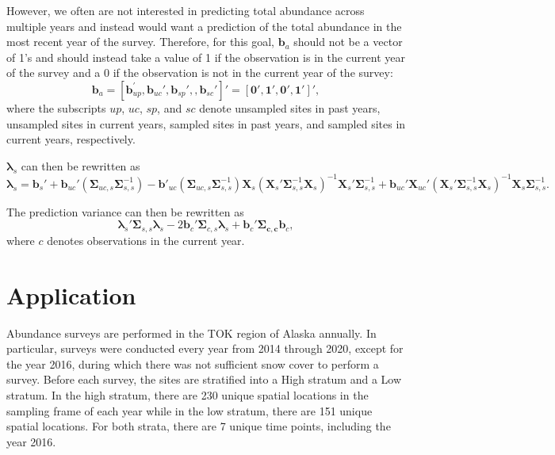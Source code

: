 \documentclass[]{interact}
\theoremstyle{plain}%
\theoremstyle{definition}
\theoremstyle{remark}
\begin{document}
However, we often are not interested in predicting total abundance
across multiple years and instead would want a prediction of the total
abundance in the most recent year of the survey. Therefore, for this
goal, \(\mathbf{b}_a\) should not be a vector of 1's and should instead
take a value of 1 if the observation is in the current year of the
survey and a 0 if the observation is not in the current year of the
survey: \mbox{} \begin{equation}
\mathbf{b}_a = [\mathbf{b}_{up}^\prime, \mathbf{b}_{uc}', \mathbf{b}_{sp}', , \mathbf{b}_{sc}']' = [\mathbf{0}', \mathbf{1}', \mathbf{0}', \mathbf{1}']',
\end{equation} \noindent where the subscripts \(up\), \(uc\), \(sp\),
and \(sc\) denote unsampled sites in past years, unsampled sites in
current years, sampled sites in past years, and sampled sites in current
years, respectively.

\(\bm{\lambda}_s\) can then be rewritten as \mbox{} \begin{equation}
\bm{\lambda}_s = \mathbf{b}_{s}' + \mathbf{b}_{uc}' (\bm{\Sigma}_{uc, s}\bm{\Sigma}_{s, s}^{-1}) - \mathbf{b}'_{uc}(\bm{\Sigma}_{uc, s} \bm{\Sigma}_{s, s}^{-1})\mathbf{X}_s(\mathbf{X}_s'\bm{\Sigma}_{s, s}^{-1}\mathbf{X}_s)^{-1}\mathbf{X}_s'\bm{\Sigma}_{s, s}^{-1} + \mathbf{b}_{uc}' \mathbf{X}_{uc}'(\mathbf{X}_s'\bm{\Sigma}_{s, s}^{-1}\mathbf{X}_s)^{-1}\mathbf{X}_s \bm{\Sigma}_{s, s}^{-1}.
\end{equation}

The prediction variance can then be rewritten as \mbox{}
\begin{equation}
\bm{\lambda}_s'\bm{\Sigma}_{s, s}\bm{\lambda}_s - 2 \mathbf{b}_{c}' \bm{\Sigma}_{c, s} \bm{\lambda}_s + \mathbf{b}_{c}' \bm{\Sigma_{c, c}} \mathbf{b}_{c},
\end{equation} \noindent where \(c\) denotes observations in the current
year.

\section{Application} \label{section:Application}

Abundance surveys are performed in the TOK region of Alaska annually. In
particular, surveys were conducted every year from 2014 through 2020,
except for the year 2016, during which there was not sufficient snow
cover to perform a survey. Before each survey, the sites are stratified
into a High stratum and a Low stratum. In the high stratum, there are
230 unique spatial locations in the sampling frame of each year while in
the low stratum, there are 151 unique spatial locations. For both
strata, there are 7 unique time points, including the year 2016.
\end{document}
